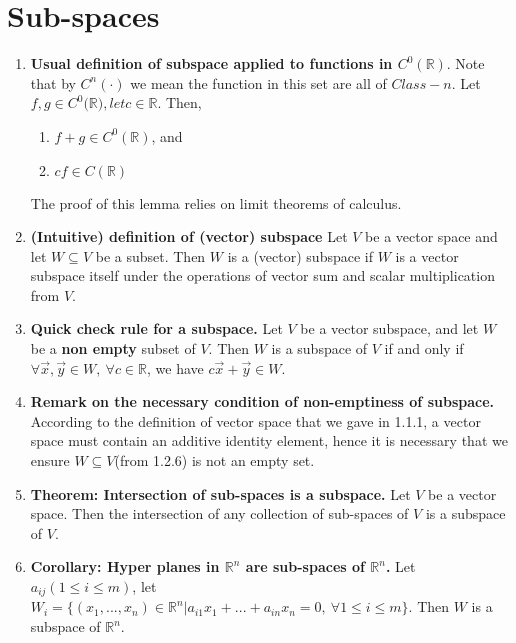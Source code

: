 \documentclass[12pt]{book}
\newcommand{\settag}[1]{\renewcommand{\theenumi}{#1}}
\newcommand{\R}{\mathbb{R}}
\begin{document}
\section{Sub-spaces}
    \begin{enumerate}
        \settag{1.2.4}
        \item \textbf{Usual definition of subspace applied to functions in $C^0(\mathbb{R})$}. Note that by $C^n(\cdot)$ we mean the function in this set are all of $Class-n$. Let $f,g \in C^0(\mathbb{R)}, let c\in \mathbb{R}$. Then, 
        \begin{enumerate}
            \item $f+g\in C^0(\R)$, and
            \item $cf \in C(\R)$
        \end{enumerate}
        The proof of this lemma relies on limit theorems of calculus.
        
        \settag{1.2.6}
        \item \textbf{(Intuitive) definition of (vector) subspace} Let $V$ be a vector space and let $W\subseteq V$ be a subset. Then $W$ is a (vector) subspace if $W$ is a vector subspace itself under the operations of vector sum and scalar multiplication from $V$.
        
        \settag{1.2.8}
        \item \textbf{Quick check rule for a subspace.} Let $V$ be a vector subspace, and let $W$ be a \textbf{non empty} subset of $V$. Then $W$ is a subspace of $V$ if and only if $\forall \vec{x}, \vec{y}\in W,~\forall c\in \R$, we have $c\vec{x}+\vec{y}\in W$.
        \settag{1.2.9}
        \item \textbf{Remark on the necessary condition of non-emptiness of subspace.} According to the definition of vector space that we gave in 1.1.1, a vector space must contain an additive identity element, hence it is necessary that we ensure $W\subseteq V$(from 1.2.6) is not an empty set.
        
        \settag{1.2.13}
        \item \textbf{Theorem: Intersection of sub-spaces is a subspace.} Let $V$ be a vector space. Then the intersection of any collection of sub-spaces of $V$ is a subspace of $V$.
        
        \settag{1.2.14}
        \item \textbf{Corollary: Hyper planes in $\R^n$ are sub-spaces of $\R^n$.} Let $a_{ij}(1\leq i\leq m)$, let $W_i = \{(x_1, ..., x_n)\in \R^n|a_{i1}x_1 + ... + a_{in}x_n = 0,~\forall 1 \leq i \leq m\}$. Then $W$ is a subspace of $\R^n$.
        
    \end{enumerate}
    
\end{document}

